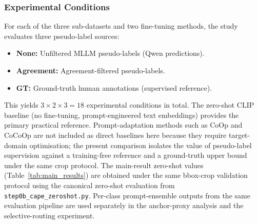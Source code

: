\documentclass[10pt,letterpaper]{article}
\begin{document}
\subsubsection*{Experimental Conditions}

For each of the three sub-datasets and two fine-tuning methods,
the study evaluates three pseudo-label sources:

\begin{itemize}
    \item \textbf{None:} Unfiltered MLLM pseudo-labels (Qwen predictions).
    \item \textbf{Agreement:} Agreement-filtered pseudo-labels.
    \item \textbf{GT:} Ground-truth human annotations (supervised reference).
\end{itemize}

This yields $3 \times 2 \times 3 = 18$ experimental conditions in total.
The zero-shot CLIP baseline (no fine-tuning,
prompt-engineered text embeddings) provides the primary practical
reference.
Prompt-adaptation methods such as CoOp and CoCoOp are not included as
direct baselines here because they require target-domain optimisation;
the present comparison isolates the value of pseudo-label supervision
against a training-free reference and a ground-truth upper bound under
the same crop protocol.
The main-result zero-shot values (Table~\ref{tab:main_results}) are
obtained under the same bbox-crop validation protocol using the
canonical zero-shot evaluation from \texttt{step0b\_cape\_zeroshot.py}.
Per-class prompt-ensemble outputs from the same
evaluation pipeline are used separately in the anchor-proxy
analysis and the selective-routing experiment.
\end{document}
